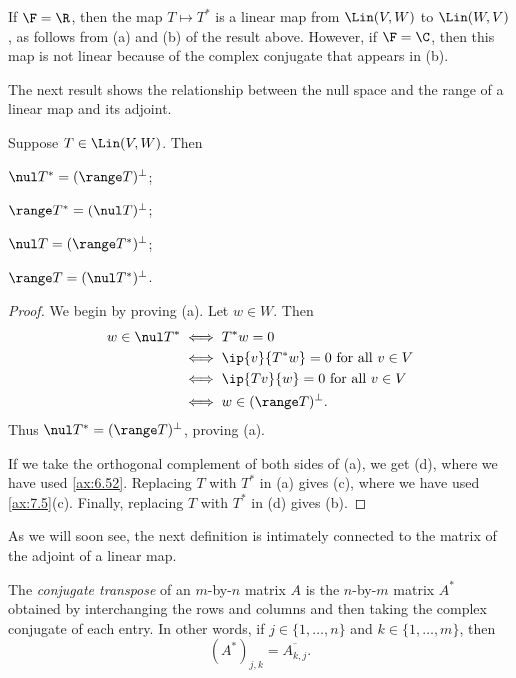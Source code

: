 If $\F=\R$, then the map $T\mapsto T^*$ is a linear map from $\Lin(V,W)$ to
$\Lin(W,V)$, as follows from (a) and (b) of the result above. However, if
$\F=\C$, then this map is not linear because of the complex conjugate that
appears in (b).

The next result shows the relationship between the null space and the range of
a linear map and its adjoint.

\begin{result}\label{ax:7.6}
Suppose $T\in\Lin(V,W)$. Then
\begin{parts}
\item $\nul T^*=(\range T)^\perp$;
\item $\range T^*=(\nul T)^\perp$;
\item $\nul T=(\range T^*)^\perp$;
\item $\range T=(\nul T^*)^\perp$.
\end{parts}
\end{result}

\begin{proof}
We begin by proving (a). Let $w\in W$. Then
\begin{align*}
w\in\nul T^* &\iff T^*w=0\\
  &\iff \ip{v}{T^*w}=0 \text{ for all } v\in V\\
  &\iff \ip{Tv}{w}=0 \text{ for all } v\in V\\
  &\iff w\in(\range T)^\perp.
\end{align*}
Thus $\nul T^*=(\range T)^\perp$, proving (a).

If we take the orthogonal complement of both sides of (a), we get (d), where we
have used \ref{ax:6.52}. Replacing $T$ with $T^*$ in (a) gives (c), where we
have used \ref{ax:7.5}(c). Finally, replacing $T$ with $T^*$ in (d) gives (b).
\end{proof}

As we will soon see, the next definition is intimately connected to the matrix
of the adjoint of a linear map.

\begin{definition}\label{ax:7.7}
The \emph{conjugate transpose} of an $m$-by-$n$ matrix $A$ is the $n$-by-$m$
matrix $A^*$ obtained by interchanging the rows and columns and then taking the
complex conjugate of each entry. In other words, if $j\in\{1,\dots,n\}$ and
$k\in\{1,\dots,m\}$, then
\[ (A^*)_{j,k} = \overline{A_{k,j}}. \]
\end{definition}

